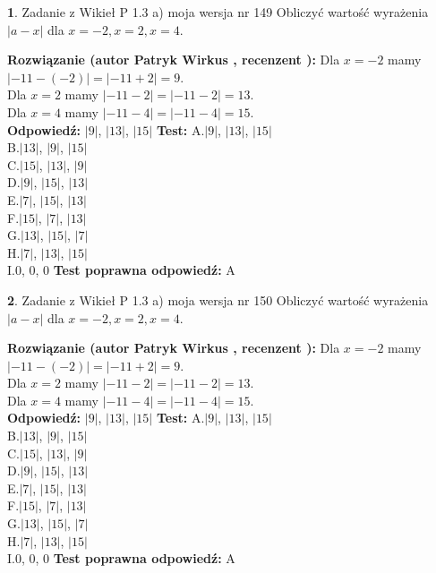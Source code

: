 \documentclass[12pt, a4paper]{article}
\theoremstyle{definition} %
\newtheorem{zad}{}
\newcommand{\zadStart}[1]{\begin{zad}#1\newline}
\newcommand{\zadStop}{\end{zad}}
\newcommand{\rozwStart}[2]{\noindent \textbf{Rozwiązanie (autor #1 , recenzent #2): }\newline}
\newcommand{\rozwStop}{\newline}
\newcommand{\odpStart}{\noindent \textbf{Odpowiedź:}\newline}
\newcommand{\odpStop}{\newline}
\newcommand{\testStart}{\noindent \textbf{Test:}\newline}
\newcommand{\testStop}{\newline}
\newcommand{\kluczStart}{\noindent \textbf{Test poprawna odpowiedź:}\newline}
\newcommand{\kluczStop}{\newline}
\begin{document}
\zadStart{Zadanie z Wikieł P 1.3 a) moja wersja nr 149}
Obliczyć wartość wyrażenia $|a - x|$ dla $x=-2,x=2,x=4$.
\zadStop
\rozwStart{Patryk Wirkus}{}
Dla $x = -2$ mamy $|-11 - (-2)| = |-11 + 2| = 9$.\\
Dla $x = 2$ mamy $|-11 - 2| = |-11 - 2| = 13$.\\
Dla $x = 4$ mamy $|-11 - 4| = |-11 - 4| = 15$.\\
\rozwStop
\odpStart
$|9|$, $|13|$, $|15|$
\odpStop
\testStart
A.$|9|$, $|13|$, $|15|$\\
B.$|13|$, $|9|$, $|15|$\\
C.$|15|$, $|13|$, $|9|$\\
D.$|9|$, $|15|$, $|13|$\\
E.$|7|$, $|15|$, $|13|$\\
F.$|15|$, $|7|$, $|13|$\\
G.$|13|$, $|15|$, $|7|$\\
H.$|7|$, $|13|$, $|15|$\\
I.$0$, $0$, $0$
\testStop
\kluczStart
A
\kluczStop



\zadStart{Zadanie z Wikieł P 1.3 a) moja wersja nr 150}
Obliczyć wartość wyrażenia $|a - x|$ dla $x=-2,x=2,x=4$.
\zadStop
\rozwStart{Patryk Wirkus}{}
Dla $x = -2$ mamy $|-11 - (-2)| = |-11 + 2| = 9$.\\
Dla $x = 2$ mamy $|-11 - 2| = |-11 - 2| = 13$.\\
Dla $x = 4$ mamy $|-11 - 4| = |-11 - 4| = 15$.\\
\rozwStop
\odpStart
$|9|$, $|13|$, $|15|$
\odpStop
\testStart
A.$|9|$, $|13|$, $|15|$\\
B.$|13|$, $|9|$, $|15|$\\
C.$|15|$, $|13|$, $|9|$\\
D.$|9|$, $|15|$, $|13|$\\
E.$|7|$, $|15|$, $|13|$\\
F.$|15|$, $|7|$, $|13|$\\
G.$|13|$, $|15|$, $|7|$\\
H.$|7|$, $|13|$, $|15|$\\
I.$0$, $0$, $0$
\testStop
\kluczStart
A
\kluczStop
\end{document}
